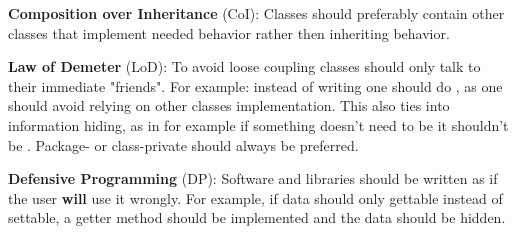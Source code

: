 \documentclass{article}
\begin{document}
\begin{enumerate}
        \textbf{Composition over Inheritance} (CoI):\newline
        Classes should preferably contain other classes that implement needed behavior rather
        then inheriting behavior.

        \textbf{Law of Demeter} (LoD):\newline
        To avoid loose coupling classes should only talk to their immediate "friends".\newline
        For example: instead of writing  one should do ,
        as one should avoid relying on other classes implementation. This also ties into
        information hiding, as in for example if something doesn't need to be  it shouldn't
        be . Package- or class-private should always be preferred.

        \textbf{Defensive Programming} (DP):\newline
        Software and libraries should be written as if the user \textbf{will} use it wrongly.
        For example, if data should only gettable instead of settable, a getter method
        should be implemented and the data should be hidden.
\end{enumerate}
\newpage
\end{document}
